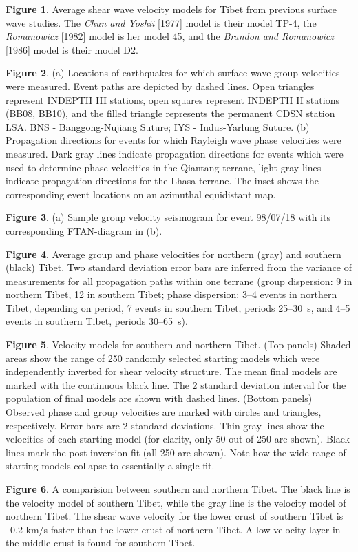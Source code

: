 \documentclass[12pt]{article}
\begin{document}
\clearpage

\noindent
{\bf Figure 1}. Average shear wave velocity models for Tibet from previous
surface wave studies.  The {\it Chun and Yoshii} [1977] model is their model
TP-4, the {\it Romanowicz} [1982] model is her model 45, and the {\it Brandon
and Romanowicz} [1986] model is their model D2.

\noindent
{\bf Figure 2}. (a) Locations of earthquakes for which surface wave group
velocities were measured.  Event paths are depicted by dashed lines.
Open triangles represent INDEPTH III stations, open squares represent
INDEPTH II stations (BB08, BB10), and the filled triangle represents
the permanent CDSN station LSA.  BNS - Banggong-Nujiang Suture; IYS -
Indus-Yarlung Suture. (b) Propagation directions for events for which
Rayleigh wave phase velocities were measured. Dark gray lines indicate propagation directions for events which were used to determine phase velocities in the Qiantang terrane, light gray lines indicate propagation directions for the Lhasa terrane. The inset shows the corresponding event locations on an azimuthal equidistant map. 

\noindent
{\bf Figure 3}. (a) Sample group velocity seismogram for event 98/07/18
with its corresponding FTAN-diagram in (b).

\noindent
{\bf Figure 4}. Average group and phase velocities for northern (gray) and southern (black) Tibet. Two standard deviation error 
bars are inferred from the variance of measurements for all
propagation paths within one terrane (group dispersion: 9  in
northern Tibet, 12 in
southern Tibet; phase dispersion: 3--4 events in northern Tibet,
depending on period, 7 events in southern Tibet, periods 25--30~s, and
4--5 events in southern Tibet, periods 30--65~s).


\noindent
{\bf Figure 5}. Velocity models for southern and northern Tibet. (Top panels) Shaded areas show the range 
of 250 randomly selected starting models which were independently inverted for shear velocity structure. 
The mean final models are marked with the continuous black line. The 2 standard deviation interval for the population of final 
models are shown with dashed lines. (Bottom panels) Observed phase and group velocities are marked with circles and triangles, respectively. Error bars are 2 standard deviations. Thin gray lines show the 
velocities of each starting model (for clarity, only 50 out of 250 are shown). Black lines mark the 
post-inversion fit (all 250 are shown). Note how the wide range of starting models collapse to essentially 
a single fit.

\noindent
{\bf Figure 6}. A comparision between southern and northern Tibet. The black line 
is the velocity model of southern Tibet, while the gray line is the velocity model of 
northern Tibet. The shear wave velocity for the lower crust of southern Tibet is 
~0.2 km/s faster than the lower crust of northern Tibet. A low-velocity layer in 
the middle crust is found for southern Tibet. 
\end{document}
